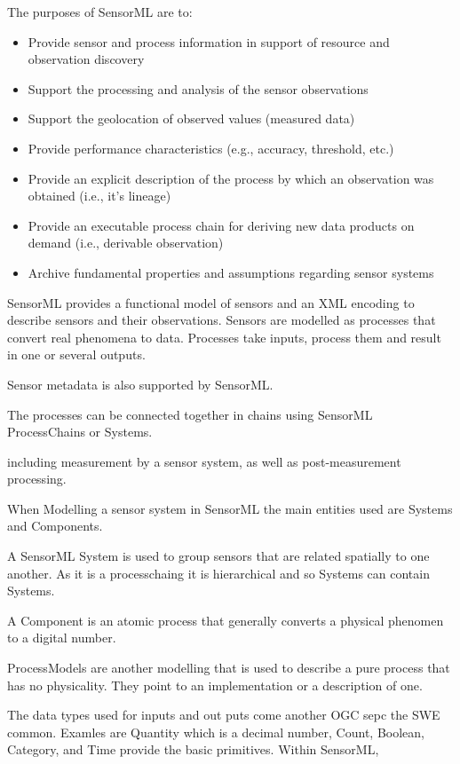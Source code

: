 \documentclass[]{final_report}
\begin{document}
The purposes of SensorML are to:
\begin{itemize}
\item Provide sensor and process information in support of resource and observation discovery
\item Support the processing and analysis of the sensor observations
\item Support the geolocation of observed values (measured data)
\item Provide performance characteristics (e.g., accuracy, threshold, etc.)
\item Provide an explicit description of the process by which an observation was obtained (i.e., it’s lineage)
\item Provide an executable process chain for deriving new data products on demand (i.e., derivable observation)
\item Archive fundamental properties and assumptions regarding sensor systems
\end{itemize}

SensorML provides a functional model of sensors and an XML encoding to describe sensors and their observations.
Sensors are modelled as processes that convert real phenomena to data. Processes take inputs, process them and result in one or several outputs.

Sensor metadata is also supported by SensorML.  

The processes can be connected together in chains using SensorML ProcessChains or Systems. 

including measurement by a sensor system, as well as post-measurement
processing.

When Modelling a sensor system in SensorML the main entities used are Systems and Components. 

A SensorML System is used to group sensors that are related spatially to one another.  As it is a processchaing it is hierarchical and so Systems can contain Systems.

A Component is an atomic process that generally converts a physical phenomen to a digital number. 

ProcessModels are another modelling that is used to describe a pure process that has no physicality. They point to an implementation or a description of one.

The data types used for inputs and out puts come another OGC sepc the SWE common. Examles are Quantity which is a decimal number, Count, Boolean, Category, and Time provide the basic primitives. Within SensorML, 
\end{document}
